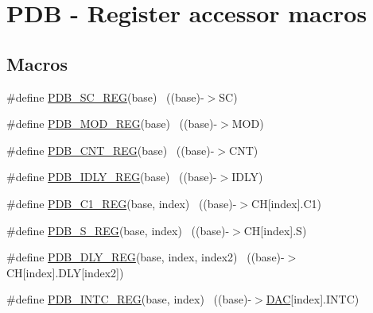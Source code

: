 \hypertarget{group___p_d_b___register___accessor___macros}{}\section{P\+DB -\/ Register accessor macros}
\label{group___p_d_b___register___accessor___macros}
\subsection*{Macros}
\begin{DoxyCompactItemize}
\item 
\#define \hyperlink{group___p_d_b___register___accessor___macros_ga1591bd73f684fdc755e12eef3d570734}{P\+D\+B\+\_\+\+S\+C\+\_\+\+R\+EG}(base)                                              ~((base)-\/$>$SC)
\item 
\#define \hyperlink{group___p_d_b___register___accessor___macros_ga8c8a28c2bc66773f6820aaa1badaffcc}{P\+D\+B\+\_\+\+M\+O\+D\+\_\+\+R\+EG}(base)                                            ~((base)-\/$>$M\+OD)
\item 
\#define \hyperlink{group___p_d_b___register___accessor___macros_ga3bc07ddecbb4c1fe42bb5953e703cca0}{P\+D\+B\+\_\+\+C\+N\+T\+\_\+\+R\+EG}(base)                                            ~((base)-\/$>$C\+NT)
\item 
\#define \hyperlink{group___p_d_b___register___accessor___macros_ga117aa5730c78ef78a2c18f49cf9a7663}{P\+D\+B\+\_\+\+I\+D\+L\+Y\+\_\+\+R\+EG}(base)                                          ~((base)-\/$>$I\+D\+LY)
\item 
\#define \hyperlink{group___p_d_b___register___accessor___macros_ga5786cd17977be8e085fe0157ec4c15fe}{P\+D\+B\+\_\+\+C1\+\_\+\+R\+EG}(base,  index)                                  ~((base)-\/$>$CH\mbox{[}index\mbox{]}.C1)
\item 
\#define \hyperlink{group___p_d_b___register___accessor___macros_gacae2553354248e45352a2dbee463e62d}{P\+D\+B\+\_\+\+S\+\_\+\+R\+EG}(base,  index)                                    ~((base)-\/$>$CH\mbox{[}index\mbox{]}.S)
\item 
\#define \hyperlink{group___p_d_b___register___accessor___macros_ga2b72a7c3b1604a38397358fd0b271851}{P\+D\+B\+\_\+\+D\+L\+Y\+\_\+\+R\+EG}(base,  index,  index2)                  ~((base)-\/$>$CH\mbox{[}index\mbox{]}.D\+LY\mbox{[}index2\mbox{]})
\item 
\#define \hyperlink{group___p_d_b___register___accessor___macros_ga872dcab8e3d15a466c56e2f7fb3d33e2}{P\+D\+B\+\_\+\+I\+N\+T\+C\+\_\+\+R\+EG}(base,  index)                              ~((base)-\/$>$\hyperlink{group___peripheral__declaration_ga4aa2a4ab86ce00c23035e5cee2e7fc7e}{D\+AC}\mbox{[}index\mbox{]}.I\+N\+TC)

\end{DoxyCompactItemize}
